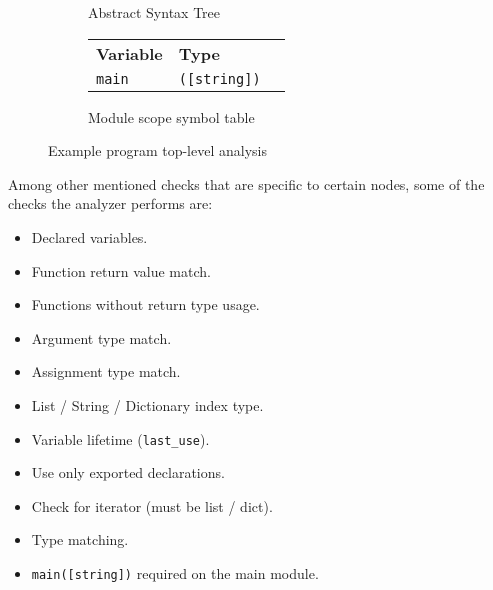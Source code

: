 \begin{figure}[H]
\begin{subfigure}{0.45\textwidth}
		\caption{Abstract Syntax Tree}
	\end{subfigure}
    \begin{subfigure}{0.45\textwidth}
		\centering
        \begin{tabular}{ l l l }
            \textbf{Variable} & \textbf{Type} \\
            \texttt{main} & \texttt{([string])} \\
		\end{tabular}
		\caption{Module scope symbol table}
	\end{subfigure}
	\caption{Example program top-level analysis}
    \label{fig:ast_example}
\end{figure}

Among other mentioned checks that are specific to certain nodes, some of the checks the analyzer performs are:

\begin{itemize}
    \item Declared variables.
    \item Function return value match.
    \item Functions without return type usage.
    \item Argument type match.
    \item Assignment type match.
    \item List / String / Dictionary index type.
    \item Variable lifetime (\texttt{last\_use}).
    \item Use only exported declarations.
    \item Check for iterator (must be list / dict).
    \item Type matching.
    \item \texttt{main([string])} required on the main module.
\end{itemize}

